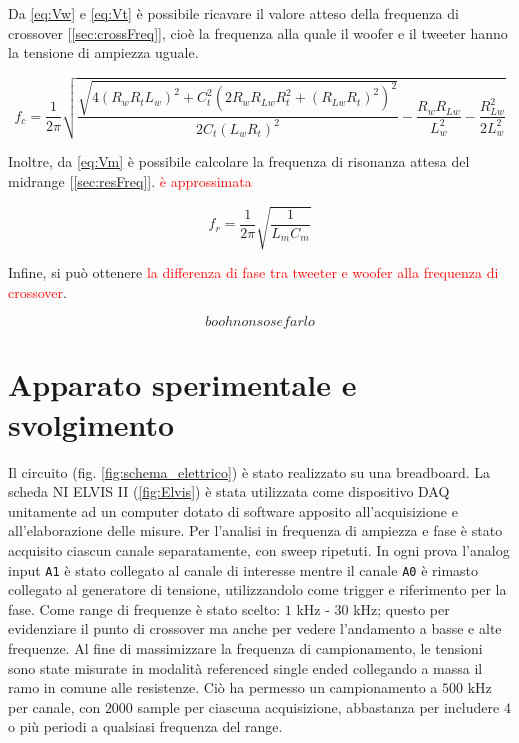 \documentclass[12pt,italian]{article}
\newcommand{\err}[1]{\textcolor{red}{#1}}
\begin{document}
Da \eqref{eq:Vw} e \eqref{eq:Vt} è possibile ricavare il valore atteso della
frequenza di crossover [\ref{sec:crossFreq}], cioè la frequenza alla quale il
woofer e il tweeter hanno la tensione di ampiezza uguale.

\begin{equation}
	f_{c} = \frac{1}{2\pi}\sqrt{\frac{\sqrt{4 (R_{w} R_{t} L_{w})^2 + C_{t}^2(2
				R_{w} R_{Lw} R_{t}^2 + (R_{Lw} R_{t})^2)^2}}{2 C _{t} (L_{w} R_{t})^2 } -
		\frac{R_{w} R_{Lw}}{L_{w}^2} - \frac{R_{Lw}^2}{2 L_{w}^2}}
	\label{eq:fc}
\end{equation}

\noindent
Inoltre, da \eqref{eq:Vm} è possibile calcolare la frequenza di risonanza attesa del midrange [\ref{sec:resFreq}].
\err{è approssimata}

\begin{equation}
	f_{r} = \frac{1}{2\pi}\sqrt{\frac{1}{L_{m} C_{m}}}  %
	\label{eq:fr}
\end{equation}

\noindent
Infine, si può ottenere \err{la differenza di fase tra tweeter e woofer alla frequenza di crossover}.

\begin{equation}
	booh non so se farlo
\end{equation}

\section*{Apparato sperimentale e svolgimento}

Il circuito (fig. \ref{fig:schema_elettrico}) è stato realizzato su una
breadboard. La scheda NI ELVIS II (\cref{fig:Elvis}) è stata utilizzata come
dispositivo DAQ unitamente ad un computer dotato di software apposito
all'acquisizione e all'elaborazione delle misure. Per l'analisi in frequenza di
ampiezza e fase è stato acquisito ciascun canale separatamente, con sweep
ripetuti. In ogni prova l'analog input \texttt{A1} è stato collegato al canale
di interesse mentre il canale \texttt{A0} è rimasto collegato al generatore di
tensione, utilizzandolo come trigger e riferimento per la fase. Come range di
frequenze è stato scelto: $1$ kHz - $30$ kHz; questo per evidenziare il punto
di crossover ma anche per vedere l'andamento a basse e alte frequenze. Al fine
di massimizzare la frequenza di campionamento, le tensioni sono state misurate
in modalità referenced single ended collegando a massa il ramo in comune alle
resistenze. Ciò ha permesso un campionamento a $500$ kHz per canale, con $2000$
sample per ciascuna acquisizione, abbastanza per includere $4$ o più periodi a
qualsiasi frequenza del range.
\end{document}
